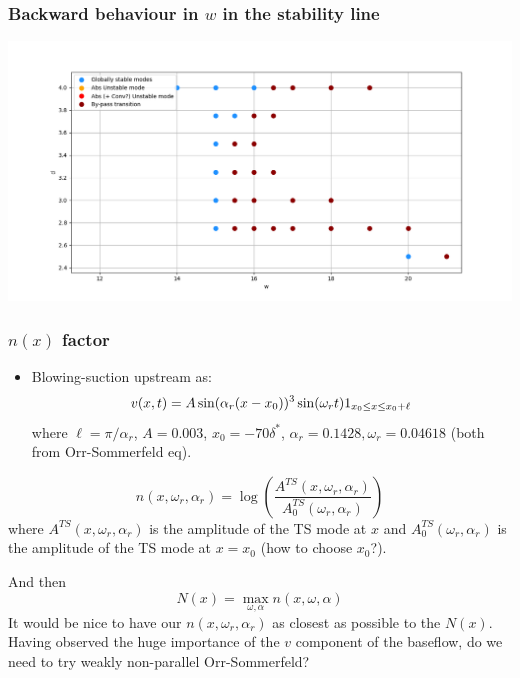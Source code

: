\documentclass[
  aspectratio=169, %
  t, %
  onlytextwidth, %
  10pt, %
]{beamer}
\begin{document}
\begin{frame}
	\frametitle{Backward behaviour in $w$ in the stability line}
	\centering
	\includegraphics[width=0.7\linewidth]{Images/zoomedstabilitycurve.png}
\end{frame}
\begin{frame}
	\frametitle{$n(x)$ factor}
	\begin{itemize}
		\item Blowing-suction upstream as:
		      $$
			      v(x,t) = A \sin(\alpha_r(x - x_0))^3\sin(\omega_r t)\boldmath{1}_{x_0\leq x \leq x_0 + \ell}
		      $$
		      where $\ell=\pi/\alpha_r$, $A = 0.003$, $x_0 = -70\delta^*$, $\alpha_r = 0.1428, \omega_r = 0.04618$ (both from Orr-Sommerfeld eq).
	\end{itemize}
	$$
		n(x,\omega_r,\alpha_r) = \log\left(\frac{A^{TS}(x,\omega_r,\alpha_r)}{A_{0}^{TS}(\omega_r,\alpha_r)}\right)
	$$
	where $A^{TS}(x,\omega_r,\alpha_r)$ is the amplitude of the TS mode at $x$ and $A_{0}^{TS}(\omega_r,\alpha_r)$ is the amplitude of the TS mode at $x=x_0$ (how to choose $x_0$?).

	And then $$N(x) = \max_{\omega,\alpha}n(x,\omega,\alpha)$$ It would be nice to have our $n(x,\omega_r,\alpha_r)$ as closest as possible to the $N(x)$. Having observed the huge importance of the $v$ component of the baseflow, do we need to try weakly non-parallel Orr-Sommerfeld?
\end{frame}
\end{document}

